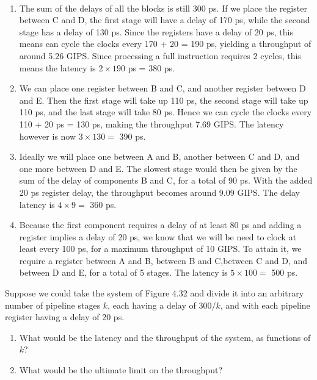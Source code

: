 \documentclass[12pt]{article}
\newenvironment{ex}[2][Exercise]{\begin{trivlist}
		\item[\hskip \labelsep {\bfseries #1}\hskip \labelsep {\bfseries #2.}]}{\end{trivlist}}
\newenvironment{sol}[1][Solution]{\begin{trivlist}
		\item[\hskip \labelsep {\bfseries #1:}]}{\end{trivlist}}
\begin{document}
\begin{sol}
	\
	\begin{enumerate}[label=(\alph*)]
		\item The sum of the delays of all the blocks is still 300 ps. If
		we place the register between C and D, the first stage will have
		a delay of 170 ps, while the second stage has a delay of 130 ps.
		Since the registers have a delay of 20 ps, this means can cycle
		the clocks every 170 + 20 = 190 ps, yielding a throughput of
		around 5.26 GIPS. Since processing a full instruction requires 2 cycles,
		this means the latency is $2\times 190$ ps = 380 ps.
		\item We can place one register between B and C, and another
		register between D and E. Then the first stage will take up 110 ps,
		the second stage will take up 110 ps, and the last stage will take
		80 ps. Hence we can cycle the clocks every 110 + 20 ps = 130 ps,
		making the throughput 7.69 GIPS. The latency however is now
		$3\times130=$ 390 ps.
		\item Ideally we will place one between A and B, another between
		C and D, and one more between D and E. The slowest stage would
		then be given by the sum of the delay of components B and C,
		for a total of 90 ps. With the added 20 ps register delay, the
		throughput becomes around 9.09 GIPS. The delay latency is
		$4\times 9=$ 360 ps.
		\item Because the first component requires a delay of at least 80 ps
		and adding a register implies a delay of 20 ps, we know that
		we will be need to clock at least every 100 ps, for a maximum 
		throughput of 10 GIPS. To attain it, we require a register between
		A and B, between B and C,between C and D, and between D and E,
		for a total of 5 stages. The latency is $5\times 100=$ 500 ps. 
	\end{enumerate}
\end{sol}

\begin{ex}{4.29}
	Suppose we could take the system of Figure 4.32 and divide it into an arbitrary
	number of pipeline stages $k$, each having a delay of $300/k$, and with each
	pipeline register having a delay of 20 ps.
	\begin{enumerate}[label=(\alph*)]
		\item What would be the latency and the throughput of the system, as functions
		of $k$?
		\item What would be the ultimate limit on the throughput?
	\end{enumerate}
\end{ex}
\end{document}
